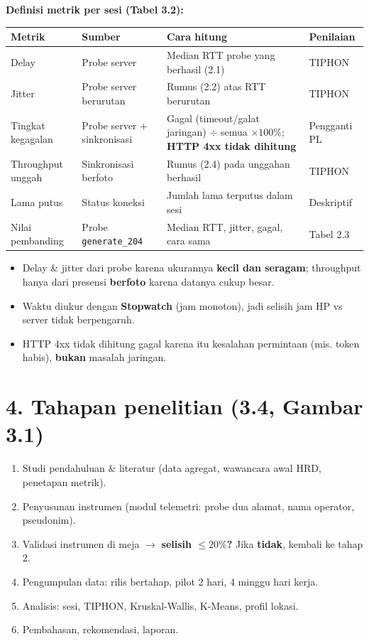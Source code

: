 \textbf{Definisi metrik per sesi (Tabel 3.2):}
\begin{center}\small
\begin{tabularx}{\linewidth}{@{}p{2.4cm}p{3.2cm}Xp{2.3cm}@{}}
\toprule
Metrik & Sumber & Cara hitung & Penilaian\\
\midrule
Delay & Probe server & Median RTT probe yang berhasil (2.1) & TIPHON\\
Jitter & Probe server berurutan & Rumus (2.2) atas RTT berurutan & TIPHON\\
Tingkat kegagalan & Probe server + sinkronisasi & Gagal (timeout/galat jaringan) $\div$ semua $\times100\%$; \textbf{HTTP 4xx tidak dihitung} & Pengganti PL\\
Throughput unggah & Sinkronisasi berfoto & Rumus (2.4) pada unggahan berhasil & TIPHON\\
Lama putus & Status koneksi & Jumlah lama terputus dalam sesi & Deskriptif\\
Nilai pembanding & Probe \texttt{generate\_204} & Median RTT, jitter, gagal, cara sama & Tabel 2.3\\
\bottomrule
\end{tabularx}
\end{center}
\begin{itemize}
  \item Delay \& jitter dari probe karena ukurannya \textbf{kecil dan seragam}; throughput hanya dari presensi \textbf{berfoto} karena datanya cukup besar.
  \item Waktu diukur dengan \textbf{Stopwatch} (jam monoton), jadi selisih jam HP vs server tidak berpengaruh.
  \item HTTP 4xx tidak dihitung gagal karena itu kesalahan permintaan (mis. token habis), \textbf{bukan} masalah jaringan.
\end{itemize}

\section*{4. Tahapan penelitian (3.4, Gambar 3.1)}
\begin{enumerate}
  \item Studi pendahuluan \& literatur (data agregat, wawancara awal HRD, penetapan metrik).
  \item Penyusunan instrumen (modul telemetri: probe dua alamat, nama operator, pseudonim).
  \item Validasi instrumen di meja $\rightarrow$ \textbf{selisih $\leq 20\%$?} Jika \textbf{tidak}, kembali ke tahap 2.
  \item Pengumpulan data: rilis bertahap, pilot 2 hari, 4 minggu hari kerja.
  \item Analisis: sesi, TIPHON, Kruskal-Wallis, K-Means, profil lokasi.
  \item Pembahasan, rekomendasi, laporan.
\end{enumerate}

